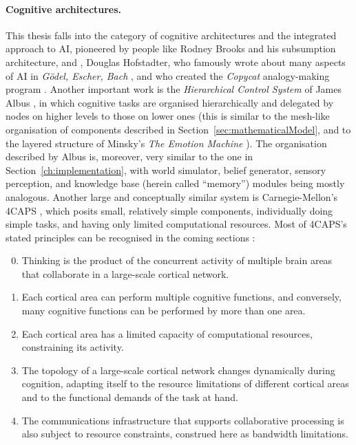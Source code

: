 \paragraph{Cognitive architectures.} This thesis falls into the category of cognitive architectures and the integrated approach to AI, pioneered by people like Rodney Brooks and his subsumption architecture, and \cite{brooksSubsumption}, Douglas Hofstadter, who famously wrote about many aspects of AI in \emph{Gödel, Escher, Bach} \cite{geb}, and who created the \emph{Copycat} analogy-making program \cite{copycat}. Another important work is the \emph{Hierarchical Control System} of James Albus \cite{albusHCS}, in which cognitive tasks are organised hierarchically and delegated by nodes on higher levels to those on lower ones (this is similar to the mesh-like organisation of components described in Section~\ref{sec:mathematicalModel}, and to the layered structure of Minsky's {\em The Emotion Machine} \cite{emotionMachine}). The organisation described by Albus \cite{albus93areference} is, moreover, very similar to the one in Section~\ref{ch:implementation}, with world simulator, belief generator, sensory perception, and knowledge base (herein called ``memory'') modules being mostly analogous. Another large and conceptually similar system is Carnegie-Mellon's 4CAPS \cite{4caps}, which posits small, relatively simple components, individually doing simple tasks, and having only limited computational resources. Most of 4CAPS's stated principles can be recognised in the coming sections \cite[Operating Principles of 4CAPS]{4caps}:
\begin{emquote}
	\begin{enumerate}
		\setcounter{enumi}{-1}
		\item Thinking is the product of the concurrent activity of multiple brain areas that collaborate in a large-scale cortical network. \ellipses
		\item Each cortical area can perform multiple cognitive functions, and conversely, many cognitive functions can be performed by more than one area.
		\item Each cortical area has a limited capacity of computational resources, constraining its activity.
		\item The topology of a large-scale cortical network changes dynamically during cognition, adapting itself to the resource limitations of different cortical areas and to the functional demands of the task at hand.
		\item The communications infrastructure that supports collaborative processing is also subject to resource constraints, construed here as bandwidth limitations.
	\end{enumerate}
	
	\quad\quad\ \ellipses
\end{emquote}

